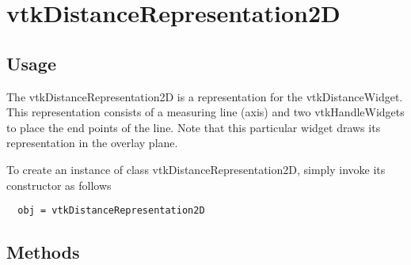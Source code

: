 \section{vtkDistanceRepresentation2D}

\subsection{Usage}

 The vtkDistanceRepresentation2D is a representation for the
 vtkDistanceWidget. This representation consists of a measuring line (axis)
 and two vtkHandleWidgets to place the end points of the line. Note that
 this particular widget draws its representation in the overlay plane.

To create an instance of class vtkDistanceRepresentation2D, simply
invoke its constructor as follows
\begin{verbatim}
  obj = vtkDistanceRepresentation2D
\end{verbatim}
\subsection{Methods}

